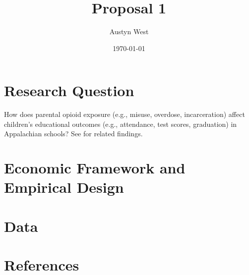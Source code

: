 \documentclass[12pt]{article}
\title{Proposal 1}
\author{Austyn West}
\date{\today}
\begin{document}
\maketitle

\section*{Research Question}
How does parental opioid exposure (e.g., misuse, overdose, incarceration) affect children’s educational outcomes (e.g., attendance, test scores, graduation) in Appalachian schools? 
See \citep{caseRisingMorbidityMortality2015} for related findings.

\section*{Economic Framework and Empirical Design}

\section*{Data}

\section*{References}
\end{document}
